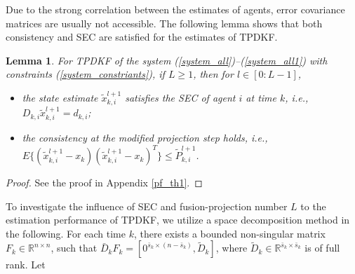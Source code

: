 \documentclass[journal,transmag]{IEEEtran}
\newtheorem{remark}{\textbf{Remark}}
\newtheorem{lemma}{\textbf{Lemma}}
\begin{document}
{	Due to the strong correlation between the estimates of agents, error covariance matrices are usually not accessible.   The following lemma shows that both   consistency  and SEC are satisfied for the estimates of TPDKF. 
	\begin{lemma}\label{thm_pro}
			 For TPDKF of the system (\ref{system_all})--(\ref{system_all1}) with constraints (\ref{system_constriants}), if $L\geq 1$, then for $l\in[0:L-1]$,
		\begin{itemize}
			\item the state estimate $\tilde x_{k,i}^{l+1}$  satisfies the SEC of agent $i$ at time $k$, i.e., $D_{k,i}\tilde x_{k,i}^{l+1}=d_{k,i}$;
			\item the consistency at the modified projection step holds, i.e., $E\{(\tilde x_{k,i}^{l+1}-x_{k})(\tilde x_{k,i}^{l+1}-x_{k})^T\}\leq \tilde P_{k,i}^{l+1}$.
		\end{itemize}		
	\end{lemma}	
	\begin{proof}
		See the proof in Appendix \ref{pf_th1}.
	\end{proof}	
To investigate the influence of SEC and fusion-projection number $L$ to the estimation performance of TPDKF, we utilize a space decomposition method in the following.
For each time $k$,
there exists a bounded non-singular matrix $F_{k}\in\mathbb{R}^{n\times n}$, such that $\bar D_{k}F_{k}=[0^{\bar s_k\times (n-\bar s_k)}, \tilde D_{k}]$, where 
$\tilde D_{k}\in\mathbb{R}^{\bar s_k\times \bar s_k}$ is of full rank.  
Let 
\begin{align*}

\end{align*}}
\end{document}
